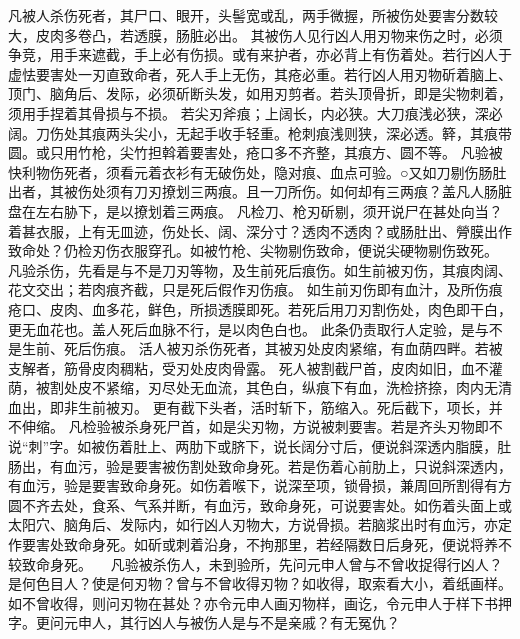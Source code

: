 \documentclass[12pt,UTF8]{ctexbook}
\begin{document}
凡被人杀伤死者，其尸口、眼开，头髻宽或乱，两手微握，所被伤处要害分数较大，皮肉多卷凸，若透膜，肠脏必出。
其被伤人见行凶人用刃物来伤之时，必须争竞，用手来遮截，手上必有伤损。或有来护者，亦必背上有伤着处。若行凶人于虚怯要害处一刃直致命者，死人手上无伤，其疮必重。若行凶人用刃物斫着脑上、顶门、脑角后、发际，必须斫断头发，如用刃剪者。若头顶骨折，即是尖物刺着，须用手捏着其骨损与不损。
若尖刃斧痕；上阔长，内必狭。大刀痕浅必狭，深必阔。刀伤处其痕两头尖小，无起手收手轻重。枪刺痕浅则狭，深必透。簳，其痕带圆。或只用竹枪，尖竹担斡着要害处，疮口多不齐整，其痕方、圆不等。
凡验被快利物伤死者，须看元着衣衫有无破伤处，隐对痕、血点可验。○又如刀剔伤肠肚出者，其被伤处须有刀刃撩划三两痕。且一刀所伤。如何却有三两痕？盖凡人肠脏盘在左右胁下，是以撩划着三两痕。
凡检刀、枪刃斫剔，须开说尸在甚处向当？着甚衣服，上有无皿迹，伤处长、阔、深分寸？透肉不透肉？或肠肚出、膋膜出作致命处？仍检刃伤衣服穿孔。如被竹枪、尖物剔伤致命，便说尖硬物剔伤致死。
凡验杀伤，先看是与不是刀刃等物，及生前死后痕伤。如生前被刃伤，其痕肉阔、花文交出；若肉痕齐截，只是死后假作刃伤痕。
如生前刃伤即有血汁，及所伤痕疮口、皮肉、血多花，鲜色，所损透膜即死。若死后用刀刃割伤处，肉色即干白，更无血花也。盖人死后血脉不行，是以肉色白也。
此条仍责取行人定验，是与不是生前、死后伤痕。
活人被刃杀伤死者，其被刃处皮肉紧缩，有血荫四畔。若被支解者，筋骨皮肉稠粘，受刃处皮肉骨露。
死人被割截尸首，皮肉如旧，血不灌荫，被割处皮不紧缩，刃尽处无血流，其色白，纵痕下有血，洗检挤捺，肉内无清血出，即非生前被刃。
更有截下头者，活时斩下，筋缩入。死后截下，项长，并不伸缩。
凡检验被杀身死尸首，如是尖刃物，方说被刺要害。若是齐头刃物即不说“刺”字。如被伤着肚上、两肋下或脐下，说长阔分寸后，便说斜深透内脂膜，肚肠出，有血污，验是要害被伤割处致命身死。若是伤着心前肋上，只说斜深透内，有血污，验是要害致命身死。如伤着喉下，说深至项，锁骨损，兼周回所割得有方圆不齐去处，食系、气系并断，有血污，致命身死，可说要害处。如伤着头面上或太阳穴、脑角后、发际内，如行凶人刃物大，方说骨损。若脑浆出时有血污，亦定作要害处致命身死。如斫或刺着沿身，不拘那里，若经隔数日后身死，便说将养不较致命身死。
　凡验被杀伤人，未到验所，先问元申人曾与不曾收捉得行凶人？是何色目人？使是何刃物？曾与不曾收得刃物？如收得，取索看大小，着纸画样。如不曾收得，则问刃物在甚处？亦令元申人画刃物样，画讫，令元申人于样下书押字。更问元申人，其行凶人与被伤人是与不是亲戚？有无冤仇？
\end{document}
